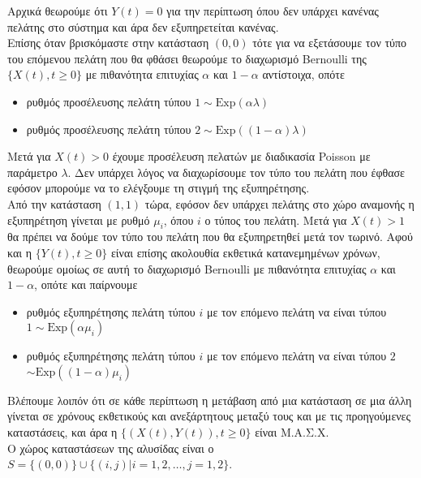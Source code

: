 \documentclass[a4paper,11pt]{article}
\newcommand{\Exp}{\mathrm{Exp}}
\newcommand{\mc}{Μ.Α.Σ.Χ. }
\begin{document}
Αρχικά θεωρούμε ότι $Y(t)=0$ για την περίπτωση όπου δεν υπάρχει κανένας πελάτης στο σύστημα και άρα δεν εξυπηρετείται κανένας.
\\[8pt]
Επίσης όταν βρισκόμαστε στην κατάσταση $(0,0)$ τότε για να εξετάσουμε τον τύπο του επόμενου πελάτη που θα φθάσει θεωρούμε το διαχωρισμό Bernoulli της $\{X(t),t\geq 0\}$ με πιθανότητα επιτυχίας $\alpha$ και $1-\alpha$ αντίστοιχα, οπότε
\begin{itemize}
	\item ρυθμός προσέλευσης πελάτη τύπου $1 \sim \Exp(\alpha \lambda)$
	\item ρυθμός προσέλευσης πελάτη τύπου $2 \sim \Exp((1-\alpha) \lambda)$
\end{itemize}
Μετά για $X(t)>0$ έχουμε προσέλευση πελατών με διαδικασία Poisson με παράμετρο $\lambda$. Δεν υπάρχει λόγος να διαχωρίσουμε τον τύπο του πελάτη που έφθασε εφόσον μπορούμε να το ελέγξουμε τη στιγμή της εξυπηρέτησης.
\\[8pt]
Από την κατάσταση $(1,1)$ τώρα, εφόσον δεν υπάρχει πελάτης στο χώρο αναμονής η εξυπηρέτηση γίνεται με ρυθμό $\mu_i$, όπου $i$ ο τύπος του πελάτη.
Μετά για $X(t)>1$ θα πρέπει να δούμε τον τύπο του πελάτη που θα εξυπηρετηθεί μετά τον τωρινό. Αφού και η $\{Y(t),t\geq 0\}$ είναι επίσης ακολουθία εκθετικά κατανεμημένων χρόνων, θεωρούμε ομοίως σε αυτή το διαχωρισμό Bernoulli με πιθανότητα επιτυχίας $\alpha$ και $1-\alpha$, οπότε και παίρνουμε
\begin{itemize}
	\item ρυθμός εξυπηρέτησης πελάτη τύπου $i$ με τον επόμενο πελάτη να είναι τύπου $1 \sim \Exp(\alpha \mu_i)$
	\item ρυθμός εξυπηρέτησης πελάτη τύπου $i$ με τον επόμενο πελάτη να είναι τύπου $2$\\
		$\sim \Exp((1-\alpha) \mu_i)$
\end{itemize}
Βλέπουμε λοιπόν ότι σε κάθε περίπτωση η μετάβαση από μια κατάσταση σε μια άλλη γίνεται σε χρόνους εκθετικούς και ανεξάρτητους μεταξύ τους και με τις προηγούμενες καταστάσεις, και άρα η $\{(X(t),Y(t)),t\geq 0\}$ είναι \mc
\\[8pt]
Ο χώρος καταστάσεων της αλυσίδας είναι ο $S = \{(0,0)\} \cup \{(i,j)|i=1,2,\dots, j=1,2\}$.
\end{document}
